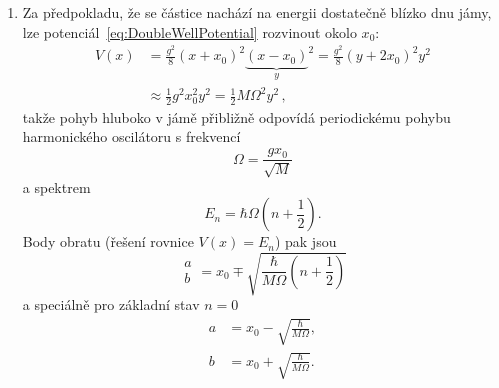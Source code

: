 \begin{solution}
\begin{enumerate}
	\item
		Za předpokladu, že se částice nachází na energii dostatečně blízko dnu jámy, lze potenciál~\eqref{eq:DoubleWellPotential} rozvinout okolo $x_{0}$:
		\begin{align}
			V(x)
				&=\frac{g^{2}}{8}\left(x+x_{0}\right)^{2}{\underbrace{\left(x-x_{0}\right)}_{y}}^{2}=\frac{g^{2}}{8}\left(y+2x_{0}\right)^{2}y^{2}\nonumber\\
				&\approx\frac{1}{2}g^{2}x_{0}^{2}y^{2}=\frac{1}{2}M\Omega^{2}y^{2}\,,
		\end{align}
		takže pohyb hluboko v jámě přibližně odpovídá periodickému pohybu harmonického oscilátoru s frekvencí
		\begin{equation}
			\Omega=\frac{gx_{0}}{\sqrt{M}}
		\end{equation}
		a spektrem
		\begin{equation}
			E_{n}=\hbar\Omega\left(n+\frac{1}{2}\right).
		\end{equation}
		Body obratu (řešení rovnice $V(x)=E_{n}$) pak jsou
		\begin{equation}
			\begin{array}{c}a \\ b\end{array}=x_{0}\mp\sqrt{\frac{\hbar}{M\Omega}\left(n+\frac{1}{2}\right)}
		\end{equation}
		a speciálně pro základní stav $n=0$
		\begin{subequations}	
			\begin{align}
				a&=x_{0}-\sqrt{\frac{\hbar}{M\Omega}},\\ 
				b&=x_{0}+\sqrt{\frac{\hbar}{M\Omega}}.
			\end{align}
		\end{subequations}
			

\end{enumerate}
\end{solution}
